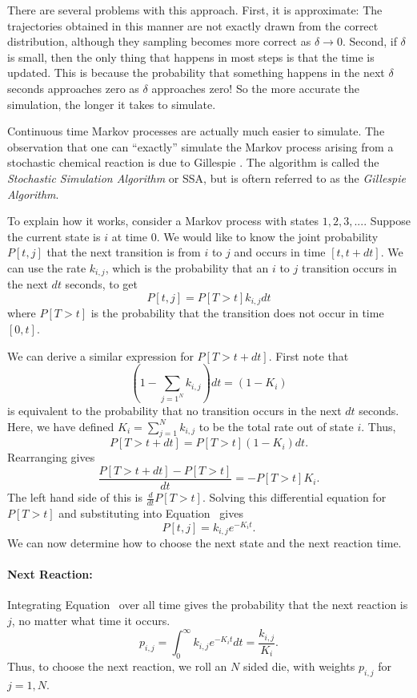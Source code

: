 There are several problems with this approach. First, it is
approximate: The trajectories obtained in this manner are not exactly
drawn from the correct distribution, although they sampling becomes
more correct as $\delta \rightarrow 0$. Second, if $\delta$ is small,
then the only thing that happens in most steps is that the time is
updated. This is because the probability that something happens in the
next $\delta$ seconds approaches zero as $\delta$ approaches zero! So
the more accurate the simulation, the longer it takes to simulate.


Continuous time Markov processes are actually much easier to
simulate. The observation that one can ``exactly'' simulate the Markov
process arising from a stochastic chemical reaction is due to
Gillespie \cite{gillespie}. The algorithm is called the {\em
  Stochastic Simulation Algorithm} or SSA, but is oftern referred to
as the {\em Gillespie Algorithm}.

To explain how it works, consider a Markov process with states
$1,2,3,...$. Suppose the current state is $i$ at time $0$. We would
like to know the joint probability $P[t,j]$ that the next transition
is from $i$ to $j$ and occurs in time $[t,t+dt]$. We can use the rate
$k_{i,j}$, which is the probability that an $i$ to $j$ transition
occurs in the next $dt$ seconds, to get
%
\begin{equation} \label{eqn:Ptj}
P[t,j] = P[T>t] k_{i,j} dt
\end{equation}
%
where $P[T>t]$ is the probability that the transition does not occur
in time $[0,t]$.

We can derive a similar expression for $P[T>t+dt]$. First note that 
%
$$
\left ( 1 - \sum_{j=1^N} k_{i,j} \right ) dt = ( 1 - K_i )
$$
%
is equivalent to the probability that no transition occurs in the next
$dt$ seconds. Here, we have defined $K_i = \sum_{j=1}^N k_{i,j}$ to be
the total rate out of state $i$. Thus,
%
$$
P[T>t+dt] = P[T>t] ( 1 - K_i ) dt . 
$$
Rearranging gives
%
$$
\frac{P[T>t+dt] - P[T>t]}{dt} = - P[T>t] K_i.
$$
%
The left hand side of this is $\frac{d}{dt}P[T>t]$. Solving this
differential equation for $P[T>t]$ and substituting into
Equation~ gives
%
\begin{equation}\label{eqn:ssa-pdf}
P[t,j] = k_{i,j} e^{-K_i t} .
\end{equation}
%
We can now determine how to choose the next state and the next reaction time.

\paragraph{Next Reaction:} Integrating Equation~
over all time gives the probability that the next reaction is $j$, no
matter what time it occurs.
%
\begin{equation}\label{eqn:next-reaction}
p_{i,j} = \int_0^\infty  k_{i,j} e^{-K_i t} dt = \frac{k_{i,j}}{K_i} .
\end{equation}
%
Thus, to choose the next reaction, we roll an $N$ sided die, with
weights $p_{i,j}$ for $j=1,N$.

